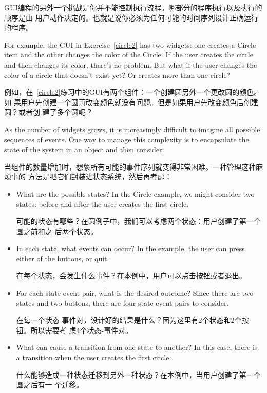 \documentclass[10pt]{book}
\begin{document}
\begin{CJK}{UTF8}{gbsn}
GUI编程的另外一个挑战是你并不能控制执行流程。哪部分的程序执行以及执行的顺序是由
用户动作决定的。也就是说你必须为任何可能的时间序列设计正确运行的程序。

For example, the GUI in Exercise~\ref{circle2} has two widgets:
one creates a Circle item and the other changes the color of the
Circle.  If the user creates the circle and then changes its color,
there's no problem.  But what if the user changes the color of
a circle that doesn't exist yet?  Or creates more than one circle?

例如，在~\ref{circle2}练习中的GUI有两个组件：一个创建圆另外一个更改圆的颜色。如
果用户先创建一个圆再改变颜色就没有问题。但是如果用户先改变颜色后创建圆？或者创
建了多个圆呢？

As the number of widgets grows, it is increasingly difficult to
imagine all possible sequences of events.  One way to manage this 
complexity is to encapsulate the state of the system in an object
and then consider:

当组件的数量增加时，想象所有可能的事件序列就变得非常困难。一种管理这种麻烦事的
方法是把它们封装进状态系统，然后再考虑：

\begin{itemize}

\item What are the possible states?  In the Circle example, we
might consider two states: before and after the user creates the
first circle.

可能的状态有哪些？在圆例子中，我们可以考虑两个状态：用户创建了第一个圆之前和之
后两个状态。

\item In each state, what events can occur?  In the example,
the user can press either of the buttons, or quit.

在每个状态，会发生什么事件？在本例中，用户可以点击按钮或者退出。

\item For each state-event pair, what is the desired outcome?
Since there are two states and two buttons, there are four
state-event pairs to consider.

在每一个状态-事件对，设计好的结果是什么？因为这里有2个状态和2个按钮。所以需要考
虑4个状态-事件对。

\item What can cause a transition from one state to another?
In this case, there is a transition when the user creates
the first circle.

什么能够造成一种状态迁移到另外一种状态？在本例中，当用户创建了第一个圆之后有一
个迁移。


\end{itemize}
\end{CJK}
\end{document}
